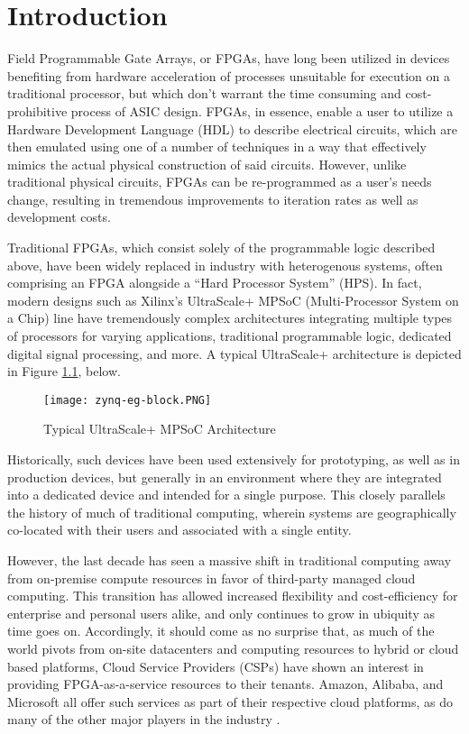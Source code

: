 
\chapter{Introduction}\label{ch:introduction}

Field Programmable Gate Arrays, or FPGAs, have long been utilized in devices benefiting from hardware acceleration of processes unsuitable for execution on a traditional processor, but which don't warrant the time consuming and cost-prohibitive process of ASIC design. FPGAs, in essence, enable a user to utilize a Hardware Development Language (HDL) to describe electrical circuits, which are then emulated using one of a number of techniques in a way that effectively mimics the actual physical construction of said circuits. However, unlike traditional physical circuits, FPGAs can be re-programmed as a user's needs change, resulting in tremendous improvements to iteration rates as well as development costs.

Traditional FPGAs, which consist solely of the programmable logic described above, have been widely replaced in industry with heterogenous systems, often comprising an FPGA alongside a ``Hard Processor System'' (HPS). In fact, modern designs such as Xilinx's UltraScale+ MPSoC (Multi-Processor System on a Chip) line have tremendously complex architectures integrating multiple types of processors for varying applications, traditional programmable logic, dedicated digital signal processing, and more. A typical UltraScale+ architecture is depicted in Figure \ref{fig:ultrascale}, below.

\begin{figure}
    \centering
    \texttt{[image: zynq-eg-block.PNG]}
    \caption[Typical UltraScale+ Architecture]{Typical UltraScale+ MPSoC Architecture \cite{noauthor_zynq_nodate}}
    \label{fig:ultrascale}
\end{figure}

Historically, such devices have been used extensively for prototyping, as well as in production devices, but generally in an environment where they are integrated into a dedicated device and intended for a single purpose. This closely parallels the history of much of traditional computing, wherein systems are geographically co-located with their users and associated with a single entity. 

However, the last decade has seen a massive shift in traditional computing away from on-premise compute resources in favor of third-party managed cloud computing. This transition has allowed increased flexibility and cost-efficiency for enterprise and personal users alike, and only continues to grow in ubiquity as time goes on. Accordingly, it should come as no surprise that, as much of the world pivots from on-site datacenters and computing resources to hybrid or cloud based platforms, Cloud Service Providers (CSPs) have shown an interest in providing FPGA-as-a-service resources to their tenants. Amazon, Alibaba, and Microsoft all offer such services as part of their respective cloud platforms, as do many of the other major players in the industry \cite{noauthor_amazon_nodate} \cite{noauthor_deep_nodate} \cite{noauthor_alveo_nodate}. 

